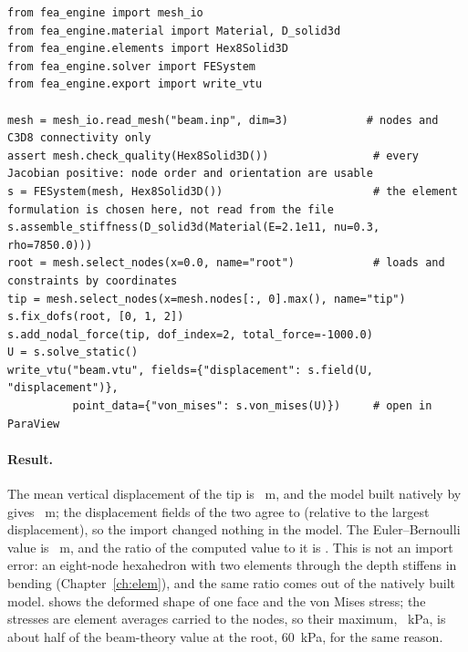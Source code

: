 \begin{lstlisting}[caption={A mesh from an Abaqus file to a result file (the file \texttt{beam.inp} is the one described above).},label={lst:me-import}]
from fea_engine import mesh_io
from fea_engine.material import Material, D_solid3d
from fea_engine.elements import Hex8Solid3D
from fea_engine.solver import FESystem
from fea_engine.export import write_vtu

mesh = mesh_io.read_mesh("beam.inp", dim=3)            # nodes and C3D8 connectivity only
assert mesh.check_quality(Hex8Solid3D())                # every Jacobian positive: node order and orientation are usable
s = FESystem(mesh, Hex8Solid3D())                       # the element formulation is chosen here, not read from the file
s.assemble_stiffness(D_solid3d(Material(E=2.1e11, nu=0.3, rho=7850.0)))
root = mesh.select_nodes(x=0.0, name="root")            # loads and constraints by coordinates
tip = mesh.select_nodes(x=mesh.nodes[:, 0].max(), name="tip")
s.fix_dofs(root, [0, 1, 2])
s.add_nodal_force(tip, dof_index=2, total_force=-1000.0)
U = s.solve_static()
write_vtu("beam.vtu", fields={"displacement": s.field(U, "displacement")},
          point_data={"von_mises": s.von_mises(U)})     # open in ParaView
\end{lstlisting}

\begin{table}[ht]
\centering\small

\caption{Checks of the import example. Case 1 compares the imported model with the same beam built by , through the displacement of every node, matched by coordinates. Cases 2 to 5 change the file.}\label{tab:me-import}
\end{table}

\paragraph{Result.} The mean vertical displacement of the tip is \cmiTip~m, and the model built natively by  gives \cmiTipNative~m; the displacement fields of the two agree to \cmiDiffNative{} (relative to the largest displacement), so the import changed nothing in the model. The Euler--Bernoulli value is \cmiEb~m, and the ratio of the computed value to it is \cmiEbRatio. This is not an import error: an eight-node hexahedron with two elements through the depth stiffens in bending (Chapter~\ref{ch:elem}), and the same ratio comes out of the natively built model.  shows the deformed shape of one face and the von Mises stress; the stresses are element averages carried to the nodes, so their maximum, \cmiVmMax~kPa, is about half of the beam-theory value at the root, $60$~kPa, for the same reason.

